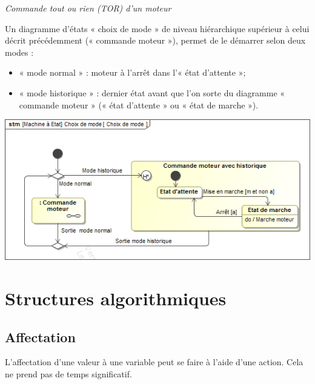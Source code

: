 \documentclass[10pt,fleqn]{article} %
\begin{document}
\begin{exemple}

\textit{Commande tout ou rien (TOR) d’un moteur}

Un diagramme d’états « choix de mode » de niveau hiérarchique supérieur à celui décrit précédemment (« commande moteur »), permet de le démarrer selon deux modes :
\begin{itemize}
\item « mode normal » : moteur à l’arrêt dans l’« état d’attente »;
\item « mode historique » : dernier état avant que l’on sorte du diagramme « commande moteur » (« état d’attente » ou « état de marche »).
\end{itemize}

\begin{center}
\includegraphics[width=.7\textwidth]{images/ChoixMode}
\end{center}
\end{exemple}

\section{Structures algorithmiques}
\subsection{Affectation}
L’affectation d’une valeur à une variable peut se faire à l’aide d’une action. Cela ne prend pas
de temps significatif.
\end{document}
